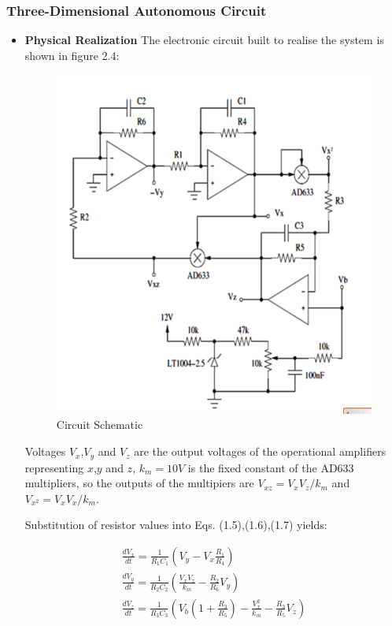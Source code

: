 \subsubsection{Three-Dimensional Autonomous Circuit}
  \begin{itemize}
   \item \textbf{Physical Realization}
    The electronic circuit built to realise the system is shown in figure 2.4:
            \begin{figure}[h]
            \centering
            \includegraphics[scale=0.3]{imagenes/2-benford/Circuit2_schem.png}
            \caption{Circuit Schematic}
            \end{figure}
Voltages $V_x$,$V_y$ and $V_z$ are the output voltages of the operational amplifiers representing $x$,$y$ and $z$, $k_m=10V$ is the fixed constant of the AD633  multipliers, so the outputs of the multipiers are $V_{xz}=V_xV_z/k_m$ and $V_{x^2}=V_xV_x/k_m$.

            Substitution of resistor values into Eqs. (1.5),(1.6),(1.7) yields:

\begin{align}
\frac{dV_x}{dt}=\frac{1}{R_1C_1} \left ( V_y -V_x\frac{R_1}{R_4} \right )\\
\frac{dV_y}{dt}=\frac{1}{R_2C_2} \left ( \frac{V_xV_z}{k_m}-\frac{R_2}{R_6}V_y \right )\\
\frac{dV_z}{dt}=\frac{1}{R_3C_3} \left ( V_b\left ( 1+\frac{R_3}{R_5} \right )  -\frac{V_x^2}{k_m} - \frac{R_3}{R_5}V_z\right )
\end{align}


\end{itemize}
